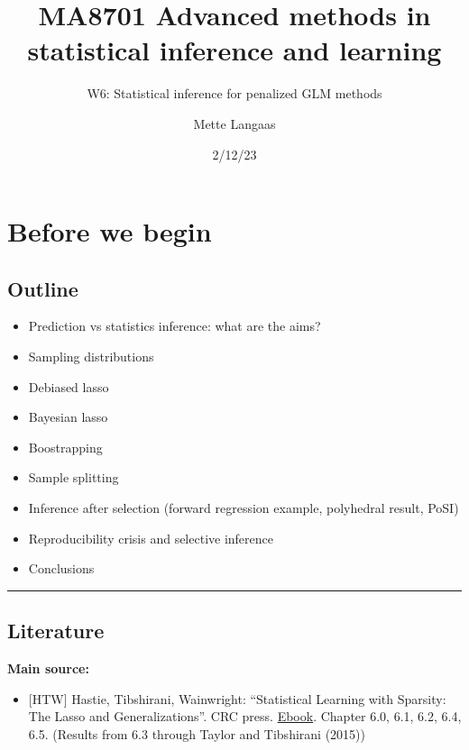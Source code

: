 \documentclass[
  letterpaper,
  DIV=11,
  numbers=noendperiod]{scrartcl}
\title{MA8701 Advanced methods in statistical inference and learning}
\subtitle{W6: Statistical inference for penalized GLM methods}
\author{Mette Langaas}
\date{2/12/23}
\providecommand{\tightlist}{%
  \setlength{\itemsep}{0pt}\setlength{\parskip}{0pt}}\usepackage{longtable,booktabs,array}
\renewcommand*\contentsname{Table of contents}
\newcommand\contentsname{Table of contents}
\begin{document}
\maketitle
\ifdefined\Shaded\renewenvironment{Shaded}{\begin{tcolorbox}[borderline west={3pt}{0pt}{shadecolor}, enhanced, interior hidden, breakable, sharp corners, boxrule=0pt, frame hidden]}{\end{tcolorbox}}\fi

\renewcommand*\contentsname{Table of contents}
{
\hypersetup{linkcolor=}
\setcounter{tocdepth}{3}
\tableofcontents
}
\hypertarget{before-we-begin}{%
\section{Before we begin}\label{before-we-begin}}

\hypertarget{outline}{%
\subsection{Outline}\label{outline}}

\begin{itemize}
\tightlist
\item
  Prediction vs statistics inference: what are the aims?
\item
  Sampling distributions
\item
  Debiased lasso
\item
  Bayesian lasso
\item
  Boostrapping
\item
  Sample splitting
\item
  Inference after selection (forward regression example, polyhedral
  result, PoSI)
\item
  Reproducibility crisis and selective inference
\item
  Conclusions
\end{itemize}

\begin{center}\rule{0.5\linewidth}{0.5pt}\end{center}

\hypertarget{literature}{%
\subsection{Literature}\label{literature}}

\textbf{Main source:}

\begin{itemize}
\tightlist
\item
  {[}HTW{]} Hastie, Tibshirani, Wainwright: ``Statistical Learning with
  Sparsity: The Lasso and Generalizations''. CRC press.
  \href{https://trevorhastie.github.io/}{Ebook}. Chapter 6.0, 6.1, 6.2,
  6.4, 6.5. (Results from 6.3 through Taylor and Tibshirani (2015))
\end{itemize}
\end{document}
